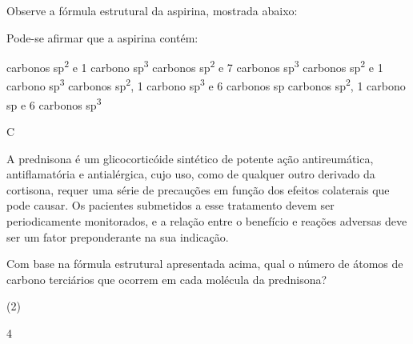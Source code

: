 \documentclass[10pt]{scrartcl}
\begin{document}
\begin{exercise}[points=1]
Observe a fórmula estrutural da aspirina, mostrada abaixo:

\begin{center}
\end{center}

Pode-se afirmar que a aspirina contém:
\begin{choice}
 carbonos sp\textsuperscript{2} e 1 carbono sp\textsuperscript{3}
 carbonos sp\textsuperscript{2} e 7 carbonos sp\textsuperscript{3}
 carbonos sp\textsuperscript{2} e 1 carbono sp\textsuperscript{3}
 carbonos sp\textsuperscript{2}, 1 carbono sp\textsuperscript{3} e 6 carbonos sp
 carbonos sp\textsuperscript{2}, 1 carbono sp e 6 carbonos sp\textsuperscript{3}
\end{choice}
\end{exercise}
\begin{solution}
C
\end{solution}







\begin{exercise}[points=1.0]
A prednisona é um glicocorticóide sintético de potente ação antireumática, antiflamatória e antialérgica, cujo uso, como de qualquer outro derivado da cortisona, requer uma série de precauções em função dos efeitos colaterais que pode causar. Os pacientes submetidos a esse tratamento devem ser periodicamente
monitorados, e a relação entre o benefício e reações adversas deve ser um fator preponderante na sua indicação.
\begin{center}
\end{center}

Com base na fórmula estrutural apresentada acima, qual o número de átomos de carbono terciários que ocorrem em cada molécula da prednisona?

\begin{choice}(2)
\end{choice}
\end{exercise}
\begin{solution}
4
\end{solution}
\end{document}
